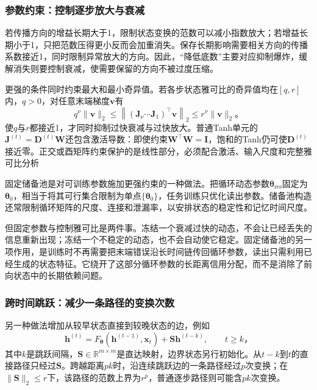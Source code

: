 \subsubsection{参数约束：控制逐步放大与衰减}
\label{sec:rnn-parameter-constraints}

若传播方向的增益长期大于1，限制状态变换的范数可以减小指数放大；若增益长期小于1，只把范数压得更小反而会加重消失。保存长期影响需要相关方向的传播系数接近1，同时限制异常放大的方向。因此，“降低底数”主要对应抑制爆炸，缓解消失则要控制衰减，使需要保留的方向不被过度压缩。

更强的条件同时约束最大和最小奇异值。若各步状态雅可比的奇异值均在$[q,r]$内，$q>0$，对任意末端梯度$\bm v$有
\begin{equation}
  q^{\nu}\lVert\bm v\rVert_2
    \leq\left\lVert(\bm J_{\nu}\cdots\bm J_1)^{\top}\bm v\right\rVert_2
    \leq r^{\nu}\lVert\bm v\rVert_2\text{。}
  \label{eq:rnn-path-singular-bounds}
\end{equation}
使$q$与$r$都接近1，才同时抑制过快衰减与过快放大。普通Tanh单元的$\bm J^{(t)}=\bm D^{(t)}\bm W$还包含激活导数：即使约束$\bm W^{\top}\bm W=\bm I$，饱和的Tanh仍可使$\bm D^{(t)}$接近零。正交或酉矩阵约束保护的是线性部分，必须配合激活、输入尺度和完整雅可比分析

固定储备池是对可训练参数施加更强约束的一种做法。把循环动态参数$\bm\theta_{\mathrm{res}}$固定为$\bm\theta_0$，相当于将其可行集合限制为单点$\{\bm\theta_0\}$，任务训练只优化读出参数。储备池构造还常限制循环矩阵的尺度、连接和泄漏率，以安排状态的稳定性和记忆时间尺度。

但固定参数与控制雅可比是两件事。冻结一个衰减过快的动态，不会让已经丢失的信息重新出现；冻结一个不稳定的动态，也不会自动使它稳定。固定储备池的另一项作用，是训练时不再需要把末端错误沿长时间链传回循环参数，读出只需利用已经生成的状态特征。它绕开了这部分循环参数的长距离信用分配，而不是消除了前向状态中的长期依赖问题。

\subsubsection{跨时间跳跃：减少一条路径的变换次数}
\label{sec:rnn-temporal-skips}

另一种做法增加从较早状态直接到较晚状态的边，例如
\begin{equation}
  \bm h^{(t)}=F_{\bm\theta}(\bm h^{(t-1)},\bm x_t)
       +\bm S\bm h^{(t-k)},\qquad t\geq k\text{，}
  \label{eq:rnn-temporal-skip}
\end{equation}
其中$k$是跳跃间隔，$\bm S\in\mathbb R^{m\times m}$是直达映射，边界状态另行初始化。从$t-k$到$t$的直接路径只经过$\bm S$。跨越距离$pk$时，沿连续跳跃边的一条路径经过$p$次变换；在$\lVert\bm S\rVert_2\leq r$下，该路径的范数上界为$r^p$，普通逐步路径则可能含$pk$次变换。

